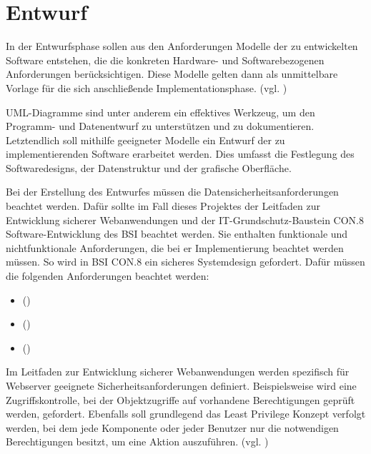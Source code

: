 \section{Entwurf}
\label{sec:Entwurf}
In der Entwurfsphase sollen aus den Anforderungen Modelle der zu entwickelten Software entstehen, die die konkreten Hardware- und Softwarebezogenen Anforderungen berücksichtigen. Diese Modelle gelten dann als unmittelbare Vorlage für die sich anschließende Implementationsphase. (vgl. \cite[S. 69]{dumke-2003})

UML-Diagramme sind unter anderem ein effektives Werkzeug, um den Programm- und Datenentwurf zu unterstützen und zu dokumentieren. Letztendlich soll mithilfe geeigneter Modelle ein Entwurf der zu implementierenden Software erarbeitet werden. Dies umfasst die Festlegung des Softwaredesigns, der Datenstruktur und der grafische Oberfläche.

Bei der Erstellung des Entwurfes müssen die Datensicherheitsanforderungen beachtet werden. Dafür sollte im Fall dieses Projektes der Leitfaden zur Entwicklung sicherer Webanwendungen und der IT-Grundschutz-Baustein CON.8 Software-Entwicklung des BSI beachtet werden. Sie enthalten funktionale und nichtfunktionale Anforderungen, die bei er Implementierung beachtet werden müssen. So wird in BSI CON.8 ein sicheres Systemdesign gefordert. Dafür müssen \ua die folgenden Anforderungen beachtet werden:
\begin{itemize}
    \item  {} (\cite[S.5]{BSICON8})
    \item  {} (\cite[S.5]{BSICON8})
    \item  {} (\cite[S.5]{BSICON8})
\end{itemize}

Im Leitfaden zur Entwicklung sicherer Webanwendungen werden spezifisch für Webserver geeignete Sicherheitsanforderungen definiert. Beispielsweise wird eine Zugriffskontrolle, bei der Objektzugriffe auf vorhandene Berechtigungen geprüft werden, gefordert. Ebenfalls soll grundlegend das Least Privilege Konzept verfolgt werden, bei dem jede Komponente oder jeder Benutzer nur die notwendigen Berechtigungen besitzt, um eine Aktion auszuführen. (vgl. \cite{BSIWeb})

